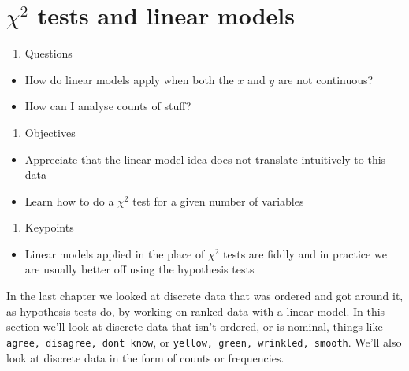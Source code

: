 \documentclass[
]{book}
\providecommand{\tightlist}{%
  \setlength{\itemsep}{0pt}\setlength{\parskip}{0pt}}
\newenvironment{task}
{ \begin{tcolorbox}[title=For you to do,title filled] }
{  \end{tcolorbox} }
\begin{document}
\begin{task}
\end{task}

\hypertarget{chi-2-tests-and-linear-models}{%
\chapter{\texorpdfstring{\(\chi ^2\) tests and linear models}{\textbackslash chi \^{}2 tests and linear models}}\label{chi-2-tests-and-linear-models}}

\begin{enumerate}
\def\labelenumi{\arabic{enumi}.}
\tightlist
\item
  Questions
\end{enumerate}

\begin{itemize}
\tightlist
\item
  How do linear models apply when both the \(x\) and \(y\) are not continuous?
\item
  How can I analyse counts of stuff?
\end{itemize}

\begin{enumerate}
\def\labelenumi{\arabic{enumi}.}
\setcounter{enumi}{1}
\tightlist
\item
  Objectives
\end{enumerate}

\begin{itemize}
\tightlist
\item
  Appreciate that the linear model idea does not translate intuitively to this data
\item
  Learn how to do a \(\chi^2\) test for a given number of variables
\end{itemize}

\begin{enumerate}
\def\labelenumi{\arabic{enumi}.}
\setcounter{enumi}{2}
\tightlist
\item
  Keypoints
\end{enumerate}

\begin{itemize}
\tightlist
\item
  Linear models applied in the place of \(\chi^2\) tests are fiddly and in practice we are usually better off using the hypothesis tests
\end{itemize}

In the last chapter we looked at discrete data that was ordered and got around it, as hypothesis tests do, by working on ranked data with a linear model. In this section we'll look at discrete data that isn't ordered, or is nominal, things like \texttt{agree,\ disagree,\ don\textquotesingle{}t\ know}, or \texttt{yellow,\ green,\ wrinkled,\ smooth}. We'll also look at discrete data in the form of counts or frequencies.
\end{document}
